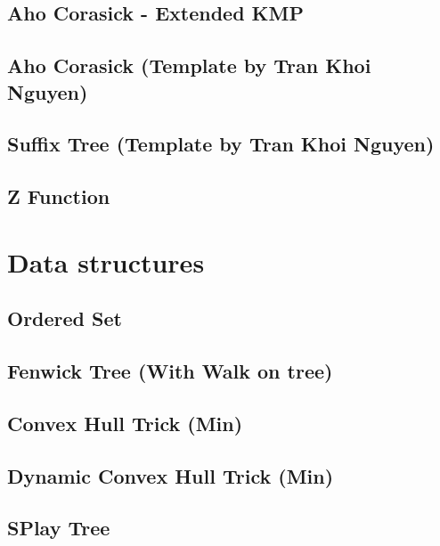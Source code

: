 \subsection{Aho Corasick - Extended KMP}
\raggedbottom
\hrulefill
\subsection{Aho Corasick (Template by Tran Khoi Nguyen)}
\raggedbottom
\hrulefill
\subsection{Suffix Tree (Template by Tran Khoi Nguyen)}
\raggedbottom
\hrulefill
\subsection{Z Function}
\raggedbottom
\hrulefill

\section{Data structures}
\subsection{Ordered Set}
\raggedbottom
\hrulefill
\subsection{Fenwick Tree (With Walk on tree)}
\raggedbottom
\hrulefill
\subsection{Convex Hull Trick (Min)}
\raggedbottom
\hrulefill
\subsection{Dynamic Convex Hull Trick (Min)}
\raggedbottom
\hrulefill
\subsection{SPlay Tree}
\raggedbottom
\hrulefill
